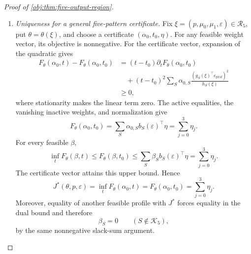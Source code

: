 \documentclass[11pt]{article}
\begin{document}
\begin{proof}[Proof of \cref{obj:thm:five-output-region}]
\begin{enumerate}
For the channel assertion, define
\[
Q^{\mathrm{sw}}(x,A)=Q(\mathfrak s x,A).
\]
This is a probability kernel and satisfies the same privacy inequalities
as \(Q\), since those inequalities hold for every input pair.
In the next identities, quantities for \(Q^{\mathrm{sw}}\) are evaluated
at assignment probability \(q\), and those for \(Q\) at \(p\).
Reindexing the four record probabilities gives equality of the output
laws; reindexing their derivatives exchanges the two parameter
coordinates. Therefore
\[
P_{\theta_{\mathrm{cen}}}Q^{\mathrm{sw}}
=
P_{\theta_{\mathrm{cen}}}Q,
\qquad
I_{\theta_{\mathrm{cen}}}(Q^{\mathrm{sw}})
=
\Pi I_{\theta_{\mathrm{cen}}}(Q)\Pi.
\]
The contrast variance is preserved by this matrix exchange. Indeed,
\(\Pi c=-c\), and for every \(v_{\mathrm{sol}}\in\mathbb R^2\),
\[
Iv_{\mathrm{sol}}=c
\quad\Longleftrightarrow\quad
(\Pi I\Pi)(-\Pi v_{\mathrm{sol}})=c,
\qquad
c^\top(-\Pi v_{\mathrm{sol}})=c^\top v_{\mathrm{sol}}.
\]
Thus the solution-value sets coincide; if they are empty, both contrast
variances equal \(+\infty\). In either case,
\[
\mathcal V(\Pi I\Pi)=\mathcal V(I).
\]
An attaining \(Q\) at \(p\) consequently gives an attaining
\(Q^{\mathrm{sw}}\) at \(q\). The centered bound yields
\(\kappa(Q^{\mathrm{sw}})\ge5\). Equality of their output laws, on the same
output space, gives
\[
\kappa(Q^{\mathrm{sw}})=\kappa(Q),
\]
and hence the desired bound at \(p\).

\item \textit{Uniqueness for a general five-pattern certificate.}
Fix \(\xi=(p,\mu_0,\mu_1,\varepsilon)\in\mathcal R_5\), put
\(\theta=\theta(\xi)\), and choose a certificate \((\alpha_0,t_0,\eta)\).
For any feasible weight vector, its objective is nonnegative.
For the certificate vector, expansion of the quadratic gives
\[
\begin{aligned}
F_\theta(\alpha_0,t)-F_\theta(\alpha_0,t_0)
&=(t-t_0)\partial_tF_\theta(\alpha_0,t_0)\\
&\quad+(t-t_0)^2
 \sum_S\alpha_{0,S}
 \frac{(g_S(\xi)^\top e_{\mathrm{prof}})^2}{h_S(\xi)}\\
&\ge0,
\end{aligned}
\]
where stationarity makes the linear term zero.
The active equalities, the vanishing inactive weights, and normalization
give
\[
F_\theta(\alpha_0,t_0)
=
\sum_S\alpha_{0,S}b_S(\varepsilon)^\top\eta
=
\sum_{j=0}^3\eta_j.
\]
For every feasible \(\beta\),
\[
\inf_tF_\theta(\beta,t)
\le F_\theta(\beta,t_0)
\le\sum_S\beta_Sb_S(\varepsilon)^\top\eta
=\sum_{j=0}^3\eta_j.
\]
The certificate vector attains this upper bound. Hence
\[
J^*(\theta,p,\varepsilon)
=
\inf_tF_\theta(\alpha_0,t)
=
F_\theta(\alpha_0,t_0)
=
\sum_{j=0}^3\eta_j.
\]
Moreover, equality of another feasible profile with \(J^*\) forces
equality in the dual bound and therefore
\[
\beta_S=0\qquad(S\notin\mathcal K_5),
\]
by the same nonnegative slack-sum argument.


\end{enumerate}
\end{proof}
\end{document}
